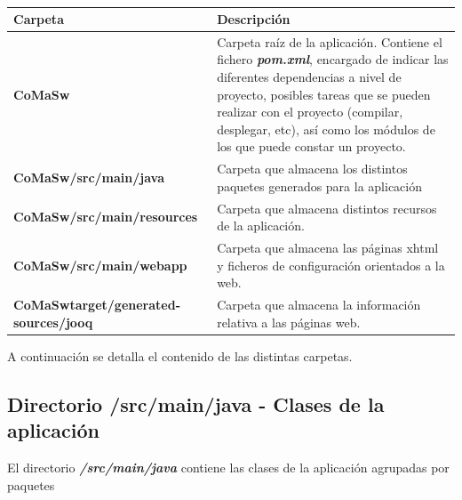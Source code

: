 \begin{table} [H]
    \centering
    \setlength{\leftmargini}{0.4cm}
	\resizebox{14cm}{!} { %
    \begin{tabular}{| m{4.5cm} | m{9.5cm} |}   
    \hline
	  \textbf{Carpeta} & \textbf{Descripción} 
	  \\\hline
	  \textbf{CoMaSw} & Carpeta raíz de la aplicación. Contiene el fichero \textit{\textbf{pom.xml}}, encargado de indicar las diferentes dependencias a nivel de proyecto, posibles tareas que se pueden realizar con el proyecto (compilar, desplegar, etc), así como los módulos de los que puede constar un proyecto.
	  \\\hline
	  \textbf{CoMaSw/src/main/java} & Carpeta que almacena los distintos paquetes generados para la aplicación
	  \\\hline
	  \textbf{CoMaSw/src/main/resources} & Carpeta que almacena distintos recursos de la aplicación.
	  \\\hline
	  \textbf{CoMaSw/src/main/webapp} & Carpeta que almacena las páginas \acrshort{xhtml} y ficheros de configuración orientados a la web.
	  \\\hline
	  \textbf{CoMaSwtarget/generated-sources/jooq} & Carpeta que almacena la información relativa a las páginas web.
	  \\\hline
    \end{tabular}
    } %
    \caption{}
    \label{tab:estructura-codigo}
\end{table}


A continuación se detalla el contenido de las distintas carpetas.

\subsection{Directorio /src/main/java - Clases de la aplicación}
\label{sub:clases}
El directorio \textit{\textbf{/src/main/java}} contiene las clases de la aplicación agrupadas por paquetes



